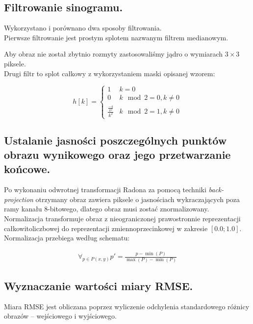 \documentclass[a4paper, 11pt]{article}
\begin{document}
\subsection{Filtrowanie sinogramu.}

Wykorzystano i porównano dwa sposoby filtrowania.\\

Pierwsze filtrowanie jest prostym splotem nazwanym filtrem medianowym.


Aby obraz nie został zbytnio rozmyty zastosowaliśmy jądro o wymiarach $3\times3$  piksele.\\


Drugi filtr to splot całkowy z wykorzystaniem maski opisanej wzorem:

$${h\left[k\right]=\begin{cases}
		1 & \text{$k = 0$} \\
		0 & \text{$k\mod 2 = 0,k\neq0$} \\
		\displaystyle\frac{\frac{-4}{\pi^2}}{k^2} & \text{$k\mod 2 = 1,k\neq0$}
		
\end{cases}}$$

\subsection{Ustalanie jasności poszczególnych punktów obrazu wynikowego oraz jego przetwarzanie końcowe.}

Po wykonaniu odwrotnej transformacji Radona za pomocą techniki \textit{back-projection} otrzymany obraz zawiera piksele o
jasnościach wykraczających poza ramy kanału 8-bitowego, dlatego obraz musi zostać znormalizowany.\\


Normalizacja transformuje obraz z nieograniczonej prawostronnie reprezentacji całkowitoliczbowej do reprezentacji
zmiennoprzecinkowej w zakresie $\left[0.0;1.0\right]$. Normalizacja przebiega według schematu:

\begin{align*}
	\forall_{p \in P(x, y)} p' = \frac{p - \min(P)}{\max(P) - \min(P)}
\end{align*}

\subsection{Wyznaczanie wartości miary RMSE.}

Miara RMSE jest obliczana poprzez wyliczenie odchylenia standardowego różnicy obrazów -- wejściowego i wyjściowego.
\end{document}
